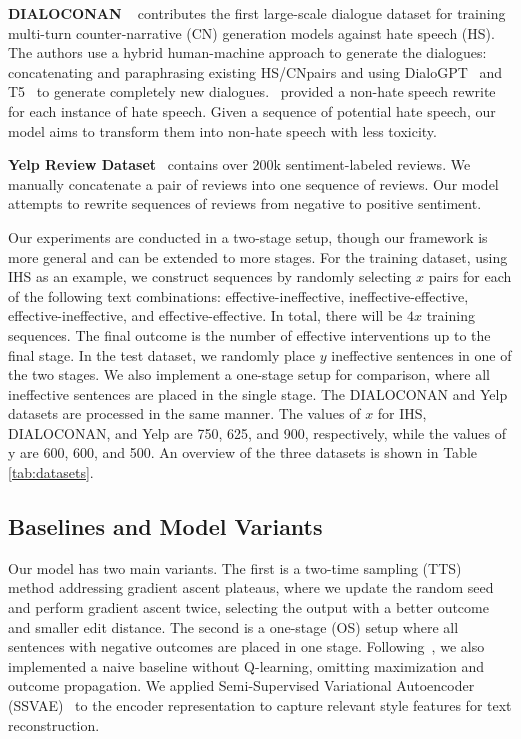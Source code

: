 \documentclass{article}
\begin{document}
\textbf{DIALOCONAN} ~\cite{bonaldi2022human} contributes the first large-scale dialogue dataset for training multi-turn counter-narrative (CN) generation models against hate speech (HS). The authors use a hybrid human-machine approach to generate the dialogues: concatenating and paraphrasing existing HS/CNpairs and using DialoGPT~\cite{zhang-etal-2020-dialogpt} and T5~\cite{raffel2020exploring} to generate completely new dialogues.~\citet{zhang2024causal} provided a non-hate speech rewrite for each instance of hate speech. Given a sequence of potential hate speech, our model aims to transform them into non-hate speech with less toxicity.

\textbf{Yelp Review Dataset}~\cite{zhang2015character} contains over 200k sentiment-labeled reviews. We manually concatenate a pair of reviews into one sequence of reviews. Our model attempts to rewrite sequences of reviews from negative to positive sentiment.


Our experiments are conducted in a two-stage setup, though our framework is more general and can be extended to more stages. For the training dataset, using IHS as an example, we construct sequences by randomly selecting $x$ pairs for each of the following text combinations: effective-ineffective, ineffective-effective, effective-ineffective, and effective-effective. In total, there will be $4x$ training sequences. The final outcome is the number of effective interventions up to the final stage. In the test dataset, we randomly place $y$ ineffective sentences in one of the two stages. We also implement a one-stage setup for comparison, where all ineffective sentences are placed in the single stage. The DIALOCONAN and Yelp datasets are processed in the same manner. The values of $x$ for IHS, DIALOCONAN, and Yelp are 750, 625, and 900, respectively, while the values of y are 600, 600, and 500.  An overview of the three datasets is shown in Table \ref{tab:datasets}.

\subsection{Baselines and Model Variants}
Our model has two main variants. The first is a two-time sampling (TTS) method addressing gradient ascent plateaus, where we update the random seed and perform gradient ascent twice, selecting the output with a better outcome and smaller edit distance. The second is a one-stage (OS) setup where all sentences with negative outcomes are placed in one stage. Following~\citet{zhang2024causal}, we also implemented a naive baseline without Q-learning, omitting maximization and outcome propagation. We applied Semi-Supervised Variational Autoencoder (SSVAE)~\cite{kingma2014semi} to the encoder representation to capture relevant style features for text reconstruction. 
\end{document}
